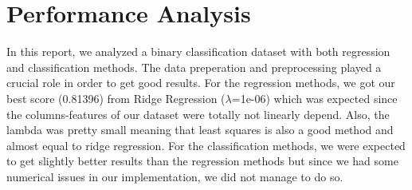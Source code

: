 \documentclass[10pt,conference,compsocconf]{IEEEtran}
\begin{document}
\section{Performance Analysis}
In this report, we analyzed a binary classification dataset with both regression and classification methods. The data preperation and preprocessing played a crucial role in order to get good results. For the regression methods, we got our best score (0.81396) from Ridge Regression ($\lambda$=1e-06) which was expected since the columns-features of our dataset were totally not linearly depend. Also, the lambda was pretty small meaning that least squares is also a good method and almost equal to ridge regression. For the classification methods, we were expected to get slightly better results than the regression methods but since we had some numerical issues in our implementation, we did not manage to do so.

%
%
\end{document}
